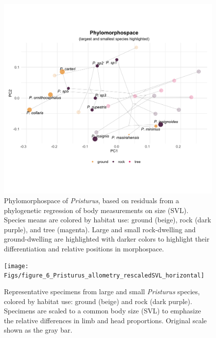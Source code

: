 \documentclass[
  11pt,
]{article}
\begin{document}
\newpage

\begin{figure}

{\centering \includegraphics[width=1\linewidth]{Figs/figure_5_phylomorphospace_large_small} 

}

\caption{Phylomorphospace of \textit{Pristurus}, based on residuals from a phylogenetic regression of body measurements on size (SVL). Species means are colored by habitat use: ground (beige), rock (dark purple), and tree (magenta). Large and small rock-dwelling and ground-dwelling are highlighted with darker colors to highlight their differentiation and relative positions in morphospace.}\label{fig:unnamed-chunk-8}
\end{figure}

\newpage

\begin{figure}

{\centering \texttt{[image: Figs/figure\_6\_Pristurus\_allometry\_rescaledSVL\_horizontal]} 

}

\caption{Representative specimens from large and small \textit{Pristurus} species, colored by habitat use: ground (beige) and rock (dark purple). Specimens are scaled to a common body size (SVL) to emphasize the relative differences in limb and head proportions. Original scale shown as the gray bar.}\label{fig:unnamed-chunk-9}
\end{figure}
\end{document}
